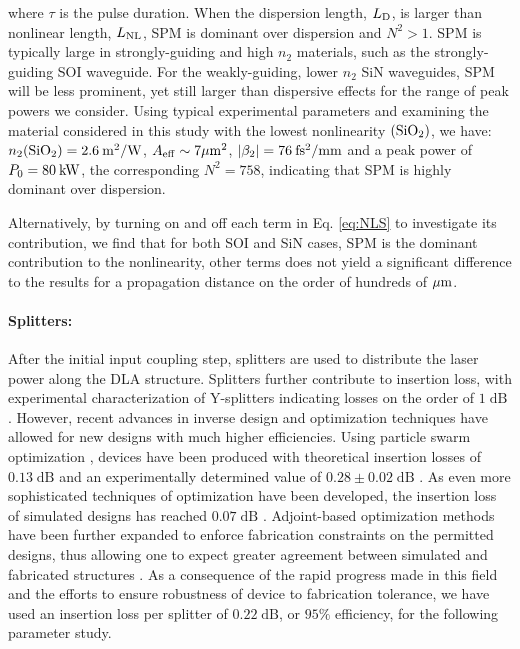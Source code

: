 where $\tau$ is the pulse duration. When the dispersion length, $L_{\rm{D}}$, is larger than nonlinear length, $L_{\rm{NL}}$, SPM is dominant over dispersion and $N^2 > 1$. SPM is typically large in strongly-guiding and high $n_2$ materials, such as the strongly-guiding SOI waveguide. For the weakly-guiding, lower $n_2$ SiN waveguides, SPM will be less prominent, yet still larger than dispersive effects for the range of peak powers we consider. Using typical experimental parameters and examining the material considered in this study with the lowest nonlinearity $(\rm{SiO_2})$, we have: $n_2(\rm{SiO_2})=2.6\:m^2/W$, $A_{\rm{eff}}\sim 7\rm{\mu m^2}$, $|\beta_2| = 76\:\rm{fs^2/mm}$ and a peak power of $P_0=80\:\rm{kW}$, the corresponding $N^2=758$, indicating that SPM is highly dominant over dispersion. 

Alternatively, by turning on and off each term in Eq. \ref{eq:NLS} to investigate its contribution, we find that for both SOI and SiN cases, SPM is the dominant contribution to the nonlinearity, other terms does not yield a significant difference to the results for a propagation distance on the order of hundreds of $\rm{\mu m}$.

\paragraph{Splitters:}

After the initial input coupling step, splitters are used to distribute the laser power along the DLA structure.
Splitters further contribute to insertion loss, with experimental characterization of Y-splitters indicating losses on the order of $1\;\text{dB}$ \cite{zhang2013compact}.
However, recent advances in inverse design and optimization techniques have allowed for new designs with much higher efficiencies.
Using particle swarm optimization \cite{eberhart1995new}, devices have been produced with theoretical insertion losses of $0.13\;\text{dB}$ and an experimentally determined value of $0.28 \pm 0.02\;\text{dB}$ \cite{zhang2013compact}.
As even more sophisticated techniques of optimization have been developed, the insertion loss of simulated designs has reached $0.07\;\text{dB}$ \cite{lalau2013adjoint}.
Adjoint-based optimization methods have been further expanded to enforce fabrication constraints on the permitted designs, thus allowing one to expect greater agreement between simulated and fabricated structures \cite{piggott2017fabrication}.
As a consequence of the rapid progress made in this field and the efforts to ensure robustness of device to fabrication tolerance, we have used an insertion loss per splitter of $0.22\;\text{dB}$, or $95\%$ efficiency, for the following parameter study.

